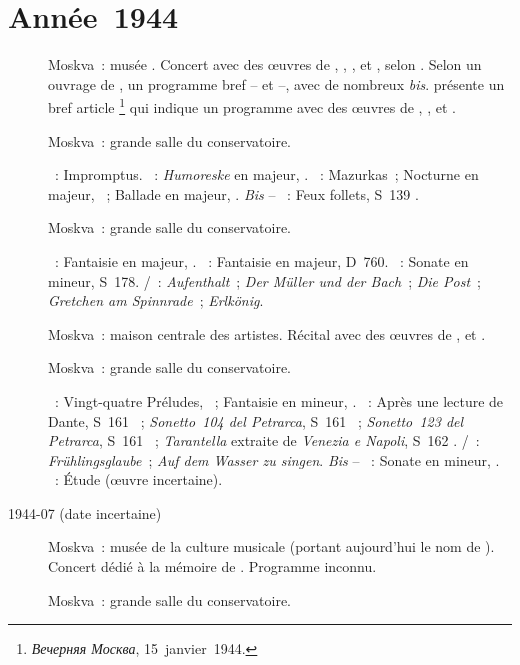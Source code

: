 \section{Année~1944}

\begin{description}
 \item[]
 Moskva~: musée \Scriabine{}.
 Concert avec des œuvres de \Beethoven{}, \Schumann{}, \Liszt{},
 \Rachmaninov{} et \Scriabine{}, selon \ASofronitsky{}.
 Selon un ouvrage de \citeauthor{Berkovskaya13}, un programme bref --
 \Scriabine{} et \Chopin{} --, avec de nombreux \emph{bis}.
 \citet{Lazarev20} présente un bref article%
 \footnote{\foreignlanguage{russian}{\emph{Вечерняя Москва}},
 15~janvier~1944.}
 qui indique un programme avec des œuvres de \Beethoven{}, \Schumann{},
 \Liszt{} et \Rachmaninov{}.
 \item[]
 Moskva~: grande salle du conservatoire.

 \textsc{\Schubert{}}~: Impromptus.
 \textsc{\Schumann{}}~: \emph{Humoreske} en \kB \Flat majeur, .
 \textsc{\Chopin{}}~: Mazurkas~; Nocturne en \kE \Flat majeur, 
 ~; Ballade en \kA \Flat majeur, .
 \emph{Bis} -- \textsc{\Liszt{}}~: Feux follets, S~139 .
 \item[]
 Moskva~: grande salle du conservatoire.

 \textsc{\Schumann{}}~: Fantaisie en \kC majeur, .
 \textsc{\Schubert{}}~: Fantaisie  en \kC majeur, D~760.
 \textsc{\Liszt{}}~: Sonate en \kB mineur, S~178.
 \textsc{\Schubert{}/\Liszt{}}~: \emph{Aufenthalt}~; \emph{Der Müller und
 der Bach}~; \emph{Die Post}~; \emph{Gretchen am Spinnrade}~;
 \emph{Erlkönig}.
 \item[]
 Moskva~: maison centrale des artistes.
 Récital avec des œuvres de \Schumann{}, \Liszt{} et \Scriabine{}.
 \item[]
 Moskva~: grande salle du conservatoire.

 \textsc{\Chopin{}}~: Vingt-quatre Préludes, ~; Fantaisie en \kF
 mineur, .
 \textsc{\Liszt{}}~: Après une lecture de Dante, S~161 ~;
 \emph{Sonetto~104 del Petrarca}, S~161 ~; \emph{Sonetto~123 del
 Petrarca}, S~161 ~; \emph{Tarantella} extraite de \emph{Venezia
 e Napoli}, S~162 .
 \textsc{\Schubert{}/\Liszt{}}~: \emph{Frühlingsglaube}~; \emph{Auf dem
 Wasser zu singen}.
 \emph{Bis} -- \textsc{\Beethoven{}}~: Sonate en \kC mineur, .
 \textsc{\Rachmaninov{}}~: Étude (œuvre incertaine).
 \item[1944-07 (date incertaine)]
 Moskva~: musée de la culture musicale (portant aujourd'hui le nom de
 \MGlinka{}).
 Concert dédié à la mémoire de \Scriabine{}.
 Programme inconnu.
 \item[]
 Moskva~: grande salle du conservatoire.


\end{description}
